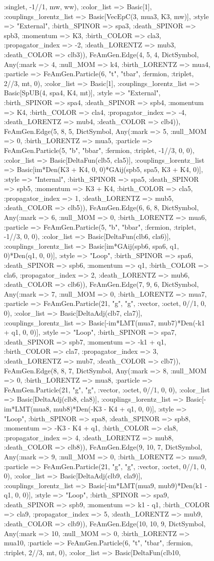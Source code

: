 \documentclass{revtex4}
\begin{document}
\begin{figure}[!htb]
\begin{center}
{:singlet, -1//1, mw, ww), :color_list => Basic[1], :couplings_lorentz_list => Basic[VecEpC(3, mua3, K3, mw)], :style => "External", :birth_SPINOR => spa3, :death_SPINOR => spb3, :momentum => K3, :birth_COLOR => cla3, :propagator_index => -2, :death_LORENTZ => mub3, :death_COLOR => clb3)), FeAmGen.Edge(4, 5, 4, Dict{Symbol, Any}(:mark => 4, :null_MOM => k4, :birth_LORENTZ => mua4, :particle => FeAmGen.Particle(6, "t", "tbar", :fermion, :triplet, 2//3, mt, 0), :color_list => Basic[1], :couplings_lorentz_list => Basic[SpUB(4, spa4, K4, mt)], :style => "External", :birth_SPINOR => spa4, :death_SPINOR => spb4, :momentum => K4, :birth_COLOR => cla4, :propagator_index => -4, :death_LORENTZ => mub4, :death_COLOR => clb4)), FeAmGen.Edge(5, 8, 5, Dict{Symbol, Any}(:mark => 5, :null_MOM => 0, :birth_LORENTZ => mua5, :particle => FeAmGen.Particle(5, "b", "bbar", :fermion, :triplet, -1//3, 0, 0), :color_list => Basic[DeltaFun(clb5, cla5)], :couplings_lorentz_list => Basic[im*Den(K3 + K4, 0, 0)*GAij(spb5, spa5, K3 + K4, 0)], :style => "Internal", :birth_SPINOR => spa5, :death_SPINOR => spb5, :momentum => K3 + K4, :birth_COLOR => cla5, :propagator_index => 1, :death_LORENTZ => mub5, :death_COLOR => clb5)), FeAmGen.Edge(6, 6, 8, Dict{Symbol, Any}(:mark => 6, :null_MOM => 0, :birth_LORENTZ => mua6, :particle => FeAmGen.Particle(5, "b", "bbar", :fermion, :triplet, -1//3, 0, 0), :color_list => Basic[DeltaFun(clb6, cla6)], :couplings_lorentz_list => Basic[im*GAij(spb6, spa6, q1, 0)*Den(q1, 0, 0)], :style => "Loop", :birth_SPINOR => spa6, :death_SPINOR => spb6, :momentum => q1, :birth_COLOR => cla6, :propagator_index => 2, :death_LORENTZ => mub6, :death_COLOR => clb6)), FeAmGen.Edge(7, 9, 6, Dict{Symbol, Any}(:mark => 7, :null_MOM => 0, :birth_LORENTZ => mua7, :particle => FeAmGen.Particle(21, "g", "g", :vector, :octet, 0//1, 0, 0), :color_list => Basic[DeltaAdj(clb7, cla7)], :couplings_lorentz_list => Basic[-im*LMT(mua7, mub7)*Den(-k1 + q1, 0, 0)], :style => "Loop", :birth_SPINOR => spa7, :death_SPINOR => spb7, :momentum => -k1 + q1, :birth_COLOR => cla7, :propagator_index => 3, :death_LORENTZ => mub7, :death_COLOR => clb7)), FeAmGen.Edge(8, 8, 7, Dict{Symbol, Any}(:mark => 8, :null_MOM => 0, :birth_LORENTZ => mua8, :particle => FeAmGen.Particle(21, "g", "g", :vector, :octet, 0//1, 0, 0), :color_list => Basic[DeltaAdj(clb8, cla8)], :couplings_lorentz_list => Basic[-im*LMT(mua8, mub8)*Den(-K3 - K4 + q1, 0, 0)], :style => "Loop", :birth_SPINOR => spa8, :death_SPINOR => spb8, :momentum => -K3 - K4 + q1, :birth_COLOR => cla8, :propagator_index => 4, :death_LORENTZ => mub8, :death_COLOR => clb8)), FeAmGen.Edge(9, 10, 7, Dict{Symbol, Any}(:mark => 9, :null_MOM => 0, :birth_LORENTZ => mua9, :particle => FeAmGen.Particle(21, "g", "g", :vector, :octet, 0//1, 0, 0), :color_list => Basic[DeltaAdj(clb9, cla9)], :couplings_lorentz_list => Basic[-im*LMT(mua9, mub9)*Den(k1 - q1, 0, 0)], :style => "Loop", :birth_SPINOR => spa9, :death_SPINOR => spb9, :momentum => k1 - q1, :birth_COLOR => cla9, :propagator_index => 5, :death_LORENTZ => mub9, :death_COLOR => clb9)), FeAmGen.Edge(10, 10, 9, Dict{Symbol, Any}(:mark => 10, :null_MOM => 0, :birth_LORENTZ => mua10, :particle => FeAmGen.Particle(6, "t", "tbar", :fermion, :triplet, 2//3, mt, 0), :color_list => Basic[DeltaFun(clb10, }
\end{center}
\end{figure}
\end{document}
